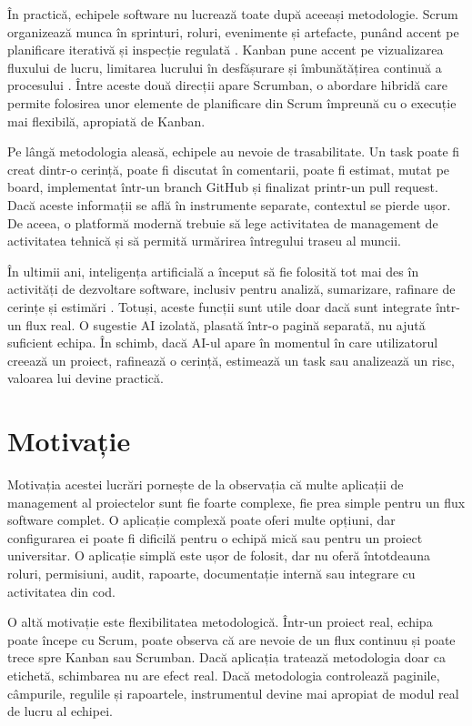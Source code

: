 \documentclass[12pt,a4paper]{report}
\begin{document}
În practică, echipele software nu lucrează toate după aceeași metodologie. Scrum organizează munca în sprinturi, roluri, evenimente și artefacte, punând accent pe planificare iterativă și inspecție regulată \cite{scrumguide2020}. Kanban pune accent pe vizualizarea fluxului de lucru, limitarea lucrului în desfășurare și îmbunătățirea continuă a procesului \cite{kanbanguide2020}. Între aceste două direcții apare Scrumban, o abordare hibridă care permite folosirea unor elemente de planificare din Scrum împreună cu o execuție mai flexibilă, apropiată de Kanban.

Pe lângă metodologia aleasă, echipele au nevoie de trasabilitate. Un task poate fi creat dintr-o cerință, poate fi discutat în comentarii, poate fi estimat, mutat pe board, implementat într-un branch GitHub și finalizat printr-un pull request. Dacă aceste informații se află în instrumente separate, contextul se pierde ușor. De aceea, o platformă modernă trebuie să lege activitatea de management de activitatea tehnică și să permită urmărirea întregului traseu al muncii.

În ultimii ani, inteligența artificială a început să fie folosită tot mai des în activități de dezvoltare software, inclusiv pentru analiză, sumarizare, rafinare de cerințe și estimări \cite{mahboob2024future}. Totuși, aceste funcții sunt utile doar dacă sunt integrate într-un flux real. O sugestie AI izolată, plasată într-o pagină separată, nu ajută suficient echipa. În schimb, dacă AI-ul apare în momentul în care utilizatorul creează un proiect, rafinează o cerință, estimează un task sau analizează un risc, valoarea lui devine practică.

\section{Motivație}
Motivația acestei lucrări pornește de la observația că multe aplicații de management al proiectelor sunt fie foarte complexe, fie prea simple pentru un flux software complet. O aplicație complexă poate oferi multe opțiuni, dar configurarea ei poate fi dificilă pentru o echipă mică sau pentru un proiect universitar. O aplicație simplă este ușor de folosit, dar nu oferă întotdeauna roluri, permisiuni, audit, rapoarte, documentație internă sau integrare cu activitatea din cod.

O altă motivație este flexibilitatea metodologică. Într-un proiect real, echipa poate începe cu Scrum, poate observa că are nevoie de un flux continuu și poate trece spre Kanban sau Scrumban. Dacă aplicația tratează metodologia doar ca etichetă, schimbarea nu are efect real. Dacă metodologia controlează paginile, câmpurile, regulile și rapoartele, instrumentul devine mai apropiat de modul real de lucru al echipei.
\end{document}
